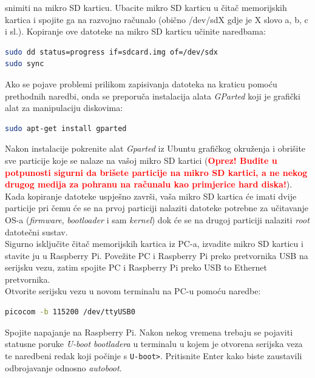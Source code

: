 \documentclass[11pt]{article}
\begin{document}
 snimiti na mikro SD karticu. Ubacite mikro SD karticu u čitač memorijskih
 kartica i spojite ga na razvojno računalo (obično /dev/sdX gdje
 je X slovo a, b, c i sl.). Kopiranje ove datoteke na mikro SD karticu učinite
 naredbama:
\begin{lstlisting}[language=bash]
sudo dd status=progress if=sdcard.img of=/dev/sdx
sudo sync
\end{lstlisting}
Ako se pojave problemi prilikom zapisivanja datoteka na kraticu pomoću
 prethodnih naredbi, onda se preporuča instalacija alata \textit{GParted} koji
 je grafički alat za manipulaciju diskovima:
\begin{lstlisting}[language=bash]
sudo apt-get install gparted
\end{lstlisting}
Nakon instalacije pokrenite alat \textit{Gparted} iz Ubuntu grafičkog okruženja
 i obrišite sve particije koje se nalaze na vašoj mikro SD kartici
 (\textbf{\textcolor{red}{Oprez! Budite u potpunosti sigurni da brišete
 particije na mikro SD kartici, a ne nekog drugog medija za pohranu na računalu
 kao primjerice hard diska!}}).\\
\newline
Kada kopiranje datoteke uspješno završi, vaša mikro SD kartica će imati dvije
 particije pri čemu će se na prvoj particiji nalaziti datoteke potrebne za
 učitavanje OS-a (\textit{firmware}, \textit{bootloader} i sam \textit{kernel})
 dok će se na drugoj particiji nalaziti \textit{root} datotečni sustav.\\
Sigurno isključite čitač memorijskih kartica iz PC-a, izvadite mikro SD karticu
 i stavite ju u Raspberry Pi. Povežite PC i Raspberry Pi preko pretvornika USB
 na serijsku vezu, zatim spojite PC i Raspberry Pi preko USB to Ethernet
 pretvornika.\\
Otvorite serijsku vezu u novom terminalu na PC-u pomoću naredbe:
\begin{lstlisting}[language=bash]
picocom -b 115200 /dev/ttyUSB0
\end{lstlisting}
Spojite napajanje na Raspberry Pi. Nakon nekog vremena trebaju se pojaviti
 statusne poruke \textit{U-boot bootladera} u terminalu u kojem je otvorena
 serijska veza te naredbeni redak koji počinje s \texttt{U-boot>}. Pritisnite
 Enter kako biste zaustavili odbrojavanje odnosno \textit{autoboot}.
\end{document}
